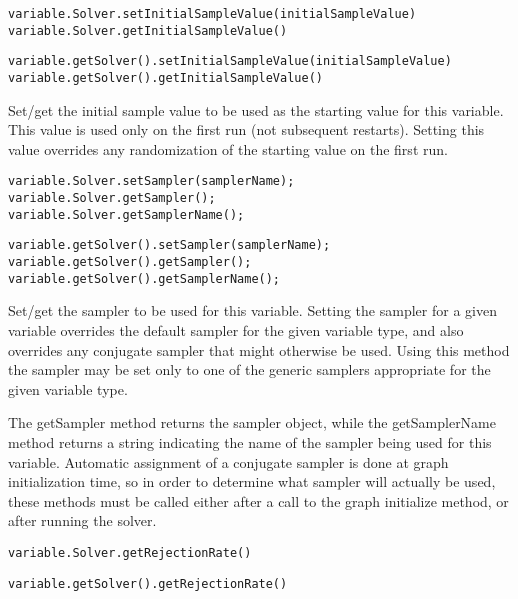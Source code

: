 \ifmatlab
\begin{lstlisting}
variable.Solver.setInitialSampleValue(initialSampleValue)
variable.Solver.getInitialSampleValue()
\end{lstlisting}
\fi

\ifjava
\begin{lstlisting}
variable.getSolver().setInitialSampleValue(initialSampleValue)
variable.getSolver().getInitialSampleValue()
\end{lstlisting}
\fi

Set/get the initial sample value to be used as the starting value for this variable.  This value is used only on the first run (not subsequent restarts).  Setting this value overrides any randomization of the starting value on the first run.


\ifmatlab
\begin{lstlisting}
variable.Solver.setSampler(samplerName);
variable.Solver.getSampler();
variable.Solver.getSamplerName();
\end{lstlisting}
\fi

\ifjava
\begin{lstlisting}
variable.getSolver().setSampler(samplerName);
variable.getSolver().getSampler();
variable.getSolver().getSamplerName();
\end{lstlisting}
\fi

Set/get the sampler to be used for this variable.  Setting the sampler for a given variable overrides the default sampler for the given variable type, and also overrides any conjugate sampler that might otherwise be used.  Using this method the sampler may be set only to one of the generic samplers appropriate for the given variable type.

The getSampler method returns the sampler object, while the getSamplerName method returns a string indicating the name of the sampler being used for this variable.  Automatic assignment of a conjugate sampler is done at graph initialization time, so in order to determine what sampler will actually be used, these methods must be called either after a call to the graph initialize method, or after running the solver.

\ifmatlab
\begin{lstlisting}
variable.Solver.getRejectionRate()
\end{lstlisting}
\fi

\ifjava
\begin{lstlisting}
variable.getSolver().getRejectionRate()
\end{lstlisting}
\fi

